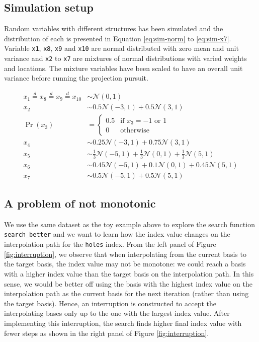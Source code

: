 \documentclass[12pt]{article}
\begin{document}
\hypertarget{simulation-setup}{%
\subsection{Simulation setup}\label{simulation-setup}}

Random variables with different structures has been simulated and the distribution of each is presented in Equation \ref{eq:sim-norm} to \ref{eq:sim-x7}. Variable \texttt{x1}, \texttt{x8}, \texttt{x9} and \texttt{x10} are normal distributed with zero mean and unit variance and \texttt{x2} to \texttt{x7} are mixtures of normal distributions with varied weights and locations. The mixture variables have been scaled to have an overall unit variance before running the projection pursuit.

\begin{align}
x_1 \overset{d}{=} x_8 \overset{d}{=} x_9 \overset{d}{=} x_{10}& \sim \mathcal{N}(0, 1) \label{eq:sim-norm} \\
x_2 &\sim 0.5 \mathcal{N}(-3, 1) + 0.5 \mathcal{N}(3, 1)\label{eq:sim-x2}\\
\Pr(x_3) &= 
\begin{cases}
0.5 & \text{if $x_3 = -1$ or $1$}\\
0 & \text{otherwise}
\end{cases}\label{eq:sim-x3}\\
x_4 &\sim 0.25 \mathcal{N}(-3, 1) + 0.75 \mathcal{N}(3, 1) \label{eq:sim-x4}\\
x_5 &\sim \frac{1}{3} \mathcal{N}(-5, 1) + \frac{1}{3} \mathcal{N}(0, 1) + \frac{1}{3} \mathcal{N}(5, 1)\label{eq:sim-x5}\\
x_6 &\sim 0.45 \mathcal{N}(-5, 1) + 0.1 \mathcal{N}(0, 1) + 0.45 \mathcal{N}(5, 1)\label{eq:sim-x6}\\
x_7 &\sim 0.5 \mathcal{N}(-5, 1) + 0.5 \mathcal{N}(5, 1) 
\label{eq:sim-x7}
\end{align}

\hypertarget{a-problem-of-not-monotonic}{%
\subsection{A problem of not monotonic}\label{a-problem-of-not-monotonic}}

We use the same dataset as the toy example above to explore the search function \texttt{search\_better} and we want to learn how the index value changes on the interpolation path for the \texttt{holes} index. From the left panel of Figure \ref{fig:interruption}, we observe that when interpolating from the current basis to the target basis, the index value may not be monotone: we could reach a basis with a higher index value than the target basis on the interpolation path. In this sense, we would be better off using the basis with the highest index value on the interpolation path as the current basis for the next iteration (rather than using the target basis). Hence, an interruption is constructed to accept the interpolating bases only up to the one with the largest index value. After implementing this interruption, the search finds higher final index value with fewer steps as shown in the right panel of Figure \ref{fig:interruption}.
\end{document}
